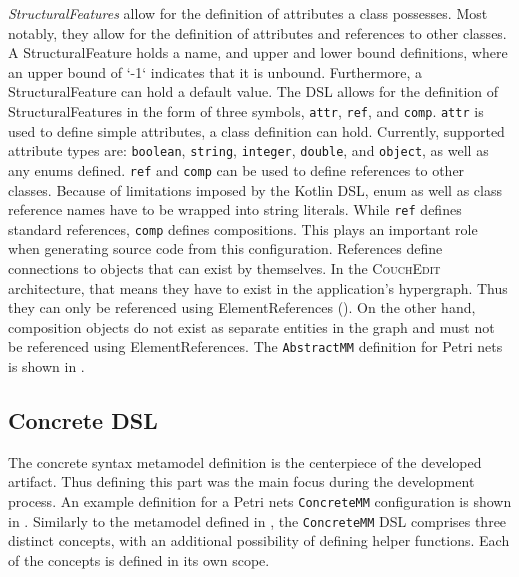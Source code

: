 
% 


% 

\emph{StructuralFeatures} allow for the definition of attributes a class possesses. Most notably, they allow for the definition of attributes and references to other classes. A StructuralFeature holds a name, and upper and lower bound definitions, where an upper bound of `-1` indicates that it is unbound. Furthermore, a StructuralFeature can hold a default value. The DSL allows for the definition of StructuralFeatures in the form of three symbols, \texttt{attr}, \texttt{ref}, and \texttt{comp}. \texttt{attr} is used to define simple attributes, a class definition can hold. Currently, supported attribute types are: \texttt{boolean}, \texttt{string}, \texttt{integer}, \texttt{double}, and \texttt{object}, as well as any enums defined. \texttt{ref} and \texttt{comp} can be used to define references to other classes. Because of limitations imposed by the Kotlin DSL, enum as well as class reference names have to be wrapped into string literals. While \texttt{ref} defines standard references, \texttt{comp} defines compositions. This plays an important role when generating source code from this configuration. References define connections to objects that can exist by themselves. In the \textsc{CouchEdit} architecture, that means they have to exist in the application's hypergraph. Thus they can only be referenced using ElementReferences (). On the other hand, composition objects do not exist as separate entities in the graph and must not be referenced using ElementReferences. The \texttt{AbstractMM} definition for Petri nets is shown in .

\subsection{Concrete DSL}
The concrete syntax metamodel definition is the centerpiece of the developed artifact. Thus defining this part was the main focus during the development process. An example definition for a Petri nets \texttt{ConcreteMM} configuration is shown in . Similarly to the metamodel defined in , the \texttt{ConcreteMM} DSL comprises three distinct concepts, with an additional possibility of defining helper functions. Each of the concepts is defined in its own scope. 


